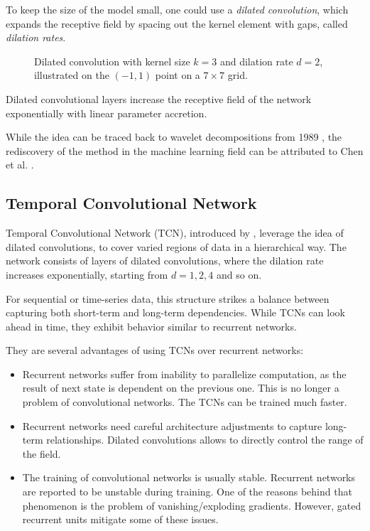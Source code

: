 To keep the size of the model small, one could use a \emph{dilated convolution}, which expands the receptive field by spacing out the kernel element with gaps, called \emph{dilation rates}.

\begin{figure}[ht!]
\centering

\caption[Dilated convolution.]{Dilated convolution with kernel size $k = 3$ and dilation rate $d = 2$, illustrated on the $(-1, 1)$ point on a $7 \times 7$ grid.}
\end{figure}

Dilated convolutional layers increase the receptive field of the network exponentially with linear parameter accretion. 

While the idea can be traced back to wavelet decompositions from 1989 \cite{Holschneider1989}, the rediscovery of the method in the machine learning field can be attributed to Chen et al. \cite{Chen2015}.

\subsection{Temporal Convolutional Network}

Temporal Convolutional Network (TCN), introduced by \cite{Colin2016}, leverage the idea of dilated convolutions, to cover varied regions of data in a hierarchical way. The network consists of layers of dilated convolutions, where the dilation rate increases exponentially, starting from $d = 1, 2, 4$ and so on.

For sequential or time-series data, this structure strikes a balance between capturing both short-term and long-term dependencies. While TCNs can look ahead in time, they exhibit behavior similar to recurrent networks.

They are several advantages of using TCNs over recurrent networks: \begin{itemize}
	\item Recurrent networks suffer from inability to parallelize computation, as the result of next state is dependent on the previous one. This is no longer a problem of convolutional networks. The TCNs can be trained much faster.
	\item Recurrent networks need careful architecture adjustments to capture long-term relationships. Dilated convolutions allows to directly control the range of the field.
	\item The training of convolutional networks is usually stable. Recurrent networks are reported to be unstable during training. One of the reasons behind that phenomenon is the problem of vanishing/exploding gradients. However, gated recurrent units mitigate some of these issues. 
\end{itemize}

